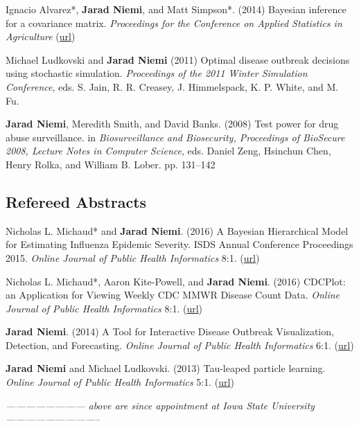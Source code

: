 \documentclass[overlapped,line]{res}
\newcommand{\sinceappt}{}
\begin{document}
\begin{resume}
Ignacio Alvarez*, {\bf Jarad Niemi}, and Matt Simpson*. (2014) Bayesian inference for a covariance matrix. \emph{Proceedings for the Conference on Applied Statistics in Agriculture} (\href{http://newprairiepress.org/agstatconference/2014/proceedings/8/}{url})

Michael Ludkovski and {\bf Jarad Niemi} (2011) Optimal disease outbreak decisions using stochastic simulation. \emph{Proceedings of the 2011 Winter Simulation Conference}, eds. S. Jain, R. R. Creasey, J. Himmelspack, K. P. White, and M. Fu.

\sinceappt

{\bf Jarad Niemi}, Meredith Smith, and David Banks. (2008) Test power for drug abuse surveillance. in \emph{Biosurveillance and Biosecurity, Proceedings of BioSecure 2008, Lecture Notes in Computer Science},  eds. Daniel Zeng, Hsinchun Chen, Henry Rolka, and William B. Lober. pp. 131--142



\subsection{\bf Refereed Abstracts} \vspace{-0.2in}

Nicholas L. Michaud* and {\bf Jarad Niemi}. (2016) A Bayesian Hierarchical Model for Estimating Influenza Epidemic Severity. ISDS Annual Conference Proceedings 2015. \emph{Online Journal of Public Health Informatics} 8:1. (\href{http://ojphi.org/ojs/index.php/ojphi/article/view/6438}{url})

Nicholas L. Michaud*, Aaron Kite-Powell, and {\bf Jarad Niemi}. (2016) CDCPlot: an Application for Viewing Weekly CDC MMWR Disease Count Data. \emph{Online Journal of Public Health Informatics} 8:1. (\href{http://ojphi.org/ojs/index.php/ojphi/article/view/6556}{url})

{\bf Jarad Niemi}. (2014) A Tool for Interactive Disease Outbreak Visualization, Detection, and Forecasting. \emph{Online Journal of Public Health Informatics} 6:1. (\href{http://ojphi.org/article/view/5017}{url})

{\bf Jarad Niemi} and Michael Ludkovski. (2013) Tau-leaped particle learning. \emph{Online Journal of Public Health Informatics} 5:1. (\href{http://dx.doi.org/10.5210%2Fojphi.v5i1.4575}{url})

\emph{------------------------ above are since appointment at Iowa State University -----------------------------}


\end{resume}
\end{document}

